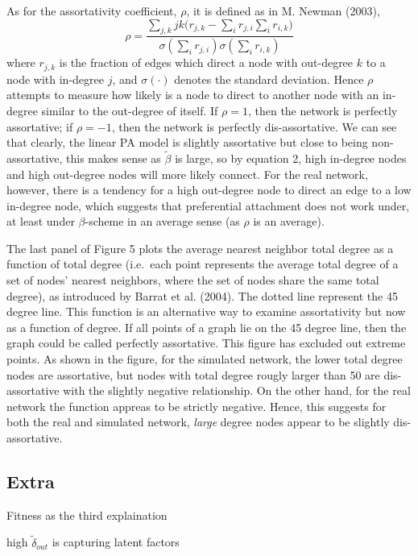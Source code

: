 \documentclass[]{elsarticle} %
\begin{document}
As for the assortativity coefficient, \(\rho\), it is defined as in M.
Newman (2003), \[
\rho = \frac{\sum_{j,k}jk \big( r_{j,k} - \sum_i r_{j,i} \sum_{i} r_{i,k} \big)}{\sigma(\sum_i r_{j,i})\sigma(\sum_{i} r_{i,k})}
\] \noindent where \(r_{j,k}\) is the fraction of edges which direct a
node with out-degree \(k\) to a node with in-degree \(j\), and
\(\sigma(\cdot)\) denotes the standard deviation. Hence \(\rho\)
attempts to measure how likely is a node to direct to another node with
an in-degree similar to the out-degree of itself. If \(\rho = 1\), then
the network is perfectly assortative; if \(\rho = -1\), then the network
is perfectly dis-assortative. We can see that clearly, the linear PA
model is slightly assortative but close to being non-assortative, this
makes sense as \(\tilde{\beta}\) is large, so by equation 2, high
in-degree nodes and high out-degree nodes will more likely connect. For
the real network, however, there is a tendency for a high out-degree
node to direct an edge to a low in-degree node, which suggests that
preferential attachment does not work under, at least under
\(\beta\)-scheme in an average sense (as \(\rho\) is an average).

The last panel of Figure 5 plots the average nearest neighbor total
degree as a function of total degree (i.e.~each point represents the
average total degree of a set of nodes' nearest neighbors, where the set
of nodes share the same total degree), as introduced by Barrat et al.
(2004). The dotted line represent the 45 degree line. This function is
an alternative way to examine assortativity but now as a function of
degree. If all points of a graph lie on the 45 degree line, then the
graph could be called perfectly assortative. This figure has excluded
out extreme points. As shown in the figure, for the simulated network,
the lower total degree nodes are assortative, but nodes with total
degree rougly larger than 50 are dis-assortative with the slightly
negative relationship. On the other hand, for the real network the
function appreas to be strictly negative. Hence, this suggests for both
the real and simulated network, \emph{large} degree nodes appear to be
slightly dis-assortative.

\subsection{Extra}\label{extra}

Fitness as the third explaination

high \(\tilde{\delta}_{out}\) is capturing latent factors
\end{document}
